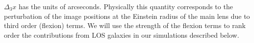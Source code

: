 $\Delta_3 x$ has the units of arcseconds. Physically this quantity corresponds to the perturbation of the image positions at the Einstein radius of the main lens due to third order (flexion) terms. We will use the strength of the flexion terms to rank order the contributions from LOS galaxies in our simulations described below.